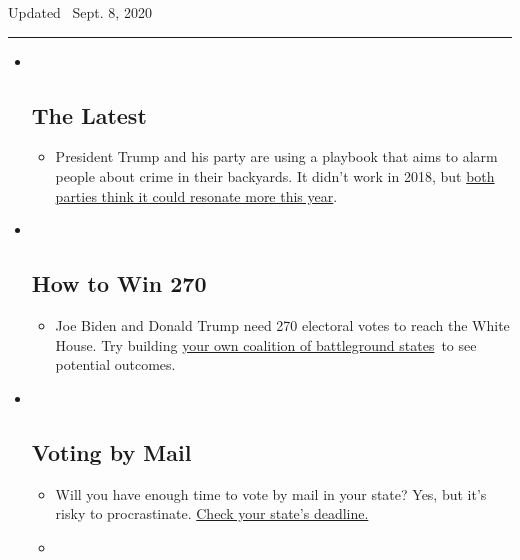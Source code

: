 Updated ~Sept. 8, 2020

\begin{center}\rule{0.5\linewidth}{\linethickness}\end{center}

\begin{itemize}
\item ~
  \hypertarget{the-latest}{%
  \subsection{The Latest}\label{the-latest}}

  \begin{itemize}
  \item
    President Trump and his party are using a playbook that aims to
    alarm people about crime in their backyards. It didn't work in 2018,
    but
    \href{https://www.nytimes3xbfgragh.onion/2020/09/08/us/politics/trump-republicans-fear-strategy.html?action=click\&pgtype=Article\&state=default\&region=BELOW_MAIN_CONTENT\&context=storylines_guide}{both
    parties think it could resonate more this year}.
  \end{itemize}
\item ~
  \hypertarget{how-to-win-270}{%
  \subsection{How to Win 270}\label{how-to-win-270}}

  \begin{itemize}
  \item
    Joe Biden and Donald Trump need 270 electoral votes to reach the
    White House. Try building
    \href{https://www.nytimes3xbfgragh.onion/interactive/2020/us/elections/election-states-biden-trump.html?action=click\&pgtype=Article\&state=default\&region=BELOW_MAIN_CONTENT\&context=storylines_guide}{your
    own coalition of battleground states}~to see potential outcomes.
  \end{itemize}
\item ~
  \hypertarget{voting-by-mail}{%
  \subsection{Voting by Mail}\label{voting-by-mail}}

  \begin{itemize}
  \item
    Will you have enough time to vote by mail in your state? Yes, but
    it's risky to procrastinate.
    \href{https://www.nytimes3xbfgragh.onion/interactive/2020/08/31/us/politics/vote-by-mail-deadlines.html?action=click\&pgtype=Article\&state=default\&region=BELOW_MAIN_CONTENT\&context=storylines_guide}{Check
    your state's deadline.}
  \item
    \href{https://www.nytimes3xbfgragh.onion/interactive/2020/us/elections/joe-biden.html?action=click\&pgtype=Article\&state=default\&region=BELOW_MAIN_CONTENT\&context=storylines_guide}{}


\end{itemize}
\end{itemize}
